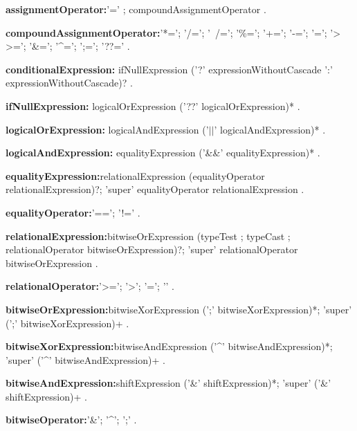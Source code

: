 \begin{grammar}
{\bf assignmentOperator:}'=' ;
      compoundAssignmentOperator
    .
\end{grammar}
\begin{grammar}
{\bf compoundAssignmentOperator:}'*=';
      '/=';
      '~/=';
      '\%=';
      '+=';
      '-=';
      '\lt \lt=';
       '> >=';
      '\&=';
      '\^{}=';
      ';=';
      '??='
    .
\end{grammar}
\begin{grammar}
  {\bf conditionalExpression:}
     ifNullExpression ('?' expressionWithoutCascade ':' expressionWithoutCascade)?
    . %
\end{grammar}
\begin{grammar}
{\bf ifNullExpression:}
  logicalOrExpression ('??' logicalOrExpression)*
  .
\end{grammar}
\begin{grammar}
{\bf logicalOrExpression:}
      logicalAndExpression ('$||$' logicalAndExpression)*
    .


{\bf logicalAndExpression:}
      equalityExpression ('\&\&' equalityExpression)*
    .
 \end{grammar}
\begin{grammar}
{\bf equalityExpression:}relationalExpression (equalityOperator relationalExpression)?;
      'super' equalityOperator relationalExpression
    .

{\bf equalityOperator:}'==';
      '!='
    .
 \end{grammar}
\begin{grammar}
{\bf relationalExpression:}bitwiseOrExpression (typeTest ; typeCast ;  relationalOperator bitwiseOrExpression)?;
      'super' relationalOperator bitwiseOrExpression
    .


{\bf relationalOperator:}'>=';
      '>';
      '\lt=';
      '\lt'
    .
 \end{grammar}
\begin{grammar}
{\bf bitwiseOrExpression:}bitwiseXorExpression (';' bitwiseXorExpression)*;
      'super' (';' bitwiseXorExpression)+
    .

{\bf bitwiseXorExpression:}bitwiseAndExpression ('\^{}' bitwiseAndExpression)*;
      'super' ('\^{}' bitwiseAndExpression)+
    .

{\bf bitwiseAndExpression:}shiftExpression ('\&' shiftExpression)*;
      'super' ('\&' shiftExpression)+
    .

{\bf bitwiseOperator:}'\&';
      '\^{}';
      ';'
    .
 \end{grammar}

